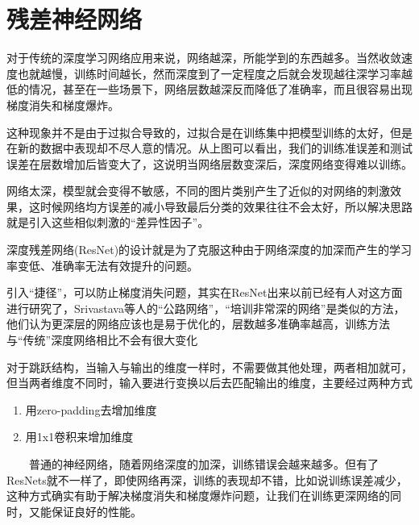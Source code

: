 \documentclass[UTF8]{ctexart}
\begin{document}
\section{残差神经网络}
对于传统的深度学习网络应用来说，网络越深，所能学到的东西越多。当然收敛速度也就越慢，训练时间越长，然而深度到了一定程度之后就会发现越往深学习率越低的情况，甚至在一些场景下，网络层数越深反而降低了准确率，而且很容易出现梯度消失和梯度爆炸。

这种现象并不是由于过拟合导致的，过拟合是在训练集中把模型训练的太好，但是在新的数据中表现却不尽人意的情况。从上图可以看出，我们的训练准误差和测试误差在层数增加后皆变大了，这说明当网络层数变深后，深度网络变得难以训练。

网络太深，模型就会变得不敏感，不同的图片类别产生了近似的对网络的刺激效果，这时候网络均方误差的减小导致最后分类的效果往往不会太好，所以解决思路就是引入这些相似刺激的“差异性因子”。

​深度残差网络(ResNet)的设计就是为了克服这种由于网络深度的加深而产生的学习率变低、准确率无法有效提升的问题。

引入“捷径”，可以防止梯度消失问题，其实在ResNet出来以前已经有人对这方面进行研究了，Srivastava等人的“公路网络”，“培训非常深的网络”是类似的方法，他们认为更深层的网络应该也是易于优化的，层数越多准确率越高，训练方法与“传统”深度网络相比不会有很大变化

对于跳跃结构，当输入与输出的维度一样时，不需要做其他处理，两者相加就可，但当两者维度不同时，输入要进行变换以后去匹配输出的维度，主要经过两种方式
\begin{enumerate}
    \item 用zero-padding去增加维度
    \item 用1x1卷积来增加维度
\end{enumerate}

　　普通的神经网络，随着网络深度的加深，训练错误会越来越多。但有了ResNets就不一样了，即使网络再深，训练的表现却不错，比如说训练误差减少，这种方式确实有助于解决梯度消失和梯度爆炸问题，让我们在训练更深网络的同时，又能保证良好的性能。
\end{document}
